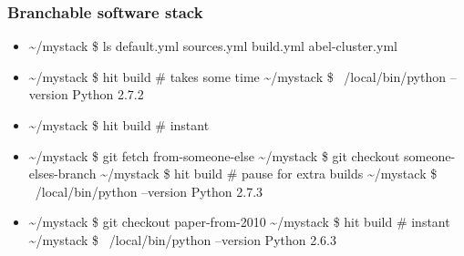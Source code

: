 \documentclass[sans,mathserif]{beamer}
\begin{document}
\begin{frame}[fragile]
\frametitle{Branchable software stack}

\begin{itemize}
\item<+->
\begin{semiverbatim}
\textasciitilde{}/mystack \$ ls
default.yml sources.yml build.yml abel-cluster.yml
\end{semiverbatim}

\item<+->
\begin{semiverbatim}
\textasciitilde{}/mystack \$ hit build # takes some time
\textasciitilde{}/mystack \$ ~/local/bin/python --version
Python 2.7.2
\end{semiverbatim}
\item<+->
\begin{semiverbatim}
\textasciitilde{}/mystack \$ hit build # instant
\end{semiverbatim}

\item<+->
\begin{semiverbatim}
\textasciitilde{}/mystack \$ git fetch from-someone-else
\textasciitilde{}/mystack \$ git checkout someone-elses-branch
\textasciitilde{}/mystack \$ hit build # pause for extra builds
\textasciitilde{}/mystack \$ ~/local/bin/python --version
Python 2.7.3
\end{semiverbatim}

\item<+->
\begin{semiverbatim}
\textasciitilde{}/mystack \$ git checkout paper-from-2010
\textasciitilde{}/mystack \$ hit build # instant
\textasciitilde{}/mystack \$ ~/local/bin/python --version
Python 2.6.3
\end{semiverbatim}
\end{itemize}
\end{frame}
\end{document}
